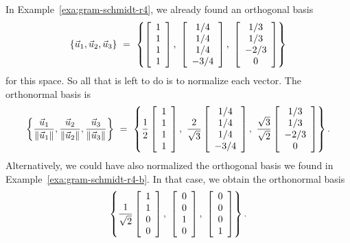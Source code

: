 \documentclass{ximera}
\begin{document}
\begin{solution}
  In Example~\ref{exa:gram-schmidt-r4}, we already found an orthogonal basis
  \begin{equation*}
    \set{\vect{u}_1,\vect{u}_2,\vect{u}_3} ~=~
    \set{
      \startmat{c} 1 \\ 1 \\ 1 \\ 1 \stopmat,~
      \startmat{c} 1/4 \\ 1/4 \\ 1/4 \\ -3/4 \stopmat,~
      \startmat{c} 1/3 \\ 1/3 \\ -2/3 \\ 0 \stopmat
    }
  \end{equation*}
  for this space. So all that is left to do is to normalize each
  vector. The orthonormal basis is
  \begin{equation*}
    \set{
      \frac{\vect{u}_1}{\norm{\vect{u}_1}},
      \frac{\vect{u}_2}{\norm{\vect{u}_2}},
      \frac{\vect{u}_3}{\norm{\vect{u}_3}}
    }
    ~=~
    \set{
      \frac{1}{2}\startmat{c} 1 \\ 1 \\ 1 \\ 1 \stopmat,~
      \frac{2}{\sqrt{3}}\startmat{c} 1/4 \\ 1/4 \\ 1/4 \\ -3/4 \stopmat,~
      \frac{\sqrt{3}}{\sqrt{2}}\startmat{c} 1/3 \\ 1/3 \\ -2/3 \\ 0 \stopmat
    }.
  \end{equation*}
  Alternatively, we could have also normalized the orthogonal basis we
  found in Example~\ref{exa:gram-schmidt-r4-b}. In that case, we
  obtain the orthonormal basis
  \begin{equation*}
    \set{
      \frac{1}{\sqrt{2}}
      \startmat{c} 1 \\ 1 \\ 0 \\ 0 \stopmat,~
      \startmat{c} 0 \\ 0 \\ 1 \\ 0 \stopmat,~
      \startmat{c} 0 \\ 0 \\ 0 \\ 1 \stopmat
    }.
  \end{equation*}
\end{solution}
\end{document}
